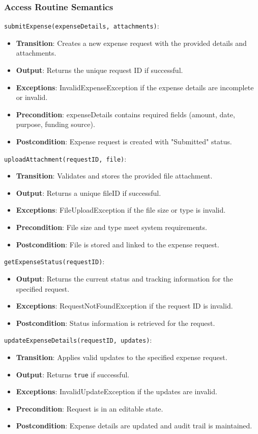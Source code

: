 \documentclass[12pt, titlepage]{article}
\begin{document}
\subsubsection{Access Routine Semantics}
\noindent \texttt{submitExpense(expenseDetails, attachments)}:
\begin{itemize}
    \item \textbf{Transition}: Creates a new expense request with the provided details and attachments.
    \item \textbf{Output}: Returns the unique request ID if successful.
    \item \textbf{Exceptions}: InvalidExpenseException if the expense details are incomplete or invalid.
    \item \textbf{Precondition}: expenseDetails contains required fields (amount, date, purpose, funding source).
    \item \textbf{Postcondition}: Expense request is created with "Submitted" status.
\end{itemize}

\noindent \texttt{uploadAttachment(requestID, file)}:
\begin{itemize}
    \item \textbf{Transition}: Validates and stores the provided file attachment.
    \item \textbf{Output}: Returns a unique fileID if successful.
    \item \textbf{Exceptions}: FileUploadException if the file size or type is invalid.
    \item \textbf{Precondition}: File size and type meet system requirements.
    \item \textbf{Postcondition}: File is stored and linked to the expense request.
\end{itemize}

\noindent \texttt{getExpenseStatus(requestID)}:
\begin{itemize}
    \item \textbf{Output}: Returns the current status and tracking information for the specified request.
    \item \textbf{Exceptions}: RequestNotFoundException if the request ID is invalid.
    \item \textbf{Postcondition}: Status information is retrieved for the request.
\end{itemize}

\noindent \texttt{updateExpenseDetails(requestID, updates)}:
\begin{itemize}
    \item \textbf{Transition}: Applies valid updates to the specified expense request.
    \item \textbf{Output}: Returns \texttt{true} if successful.
    \item \textbf{Exceptions}: InvalidUpdateException if the updates are invalid.
    \item \textbf{Precondition}: Request is in an editable state.
    \item \textbf{Postcondition}: Expense details are updated and audit trail is maintained.
\end{itemize}
\end{document}
